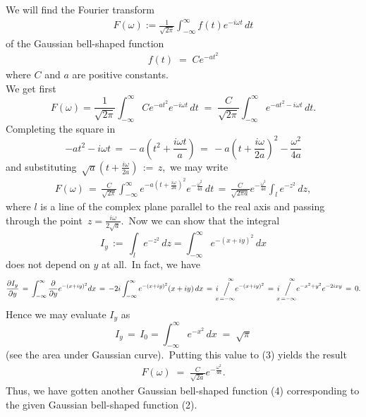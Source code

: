 \documentclass[12pt]{article}
\newcommand{\sijoitus}[2]%
{\operatornamewithlimits{\Big/}_{\!\!\!#1}^{\,#2}}
\begin{document}
  

We will find the Fourier transform 
\begin{align}
F(\omega) := \frac{1}{\sqrt{2\pi}}\int_{-\infty}^\infty f(t)e^{-i\omega t}\,dt
\end{align}
of the Gaussian bell-shaped function
\begin{align}
f(t) \;=\; Ce^{-at^2}
\end{align}
where $C$ and $a$ are positive constants.\\

We get first
$$F(\omega) = \frac{1}{\sqrt{2\pi}}\int_{-\infty}^\infty Ce^{-at^2}e^{-i\omega t}\,dt 
\;=\; \frac{C}{\sqrt{2\pi}}\int_{-\infty}^\infty e^{-at^2-i\omega t}\,dt.$$
Completing the square in
$$-at^2-i\omega t \,=\, -a\left(t^2+\frac{i\omega t}{a}\right) 
\,=\, -a\left(t+\frac{i\omega}{2a}\right)^2-\frac{\omega^2}{4a}$$
and substituting\, $\sqrt{a}\left(t+\frac{i\omega}{2a}\right) \,:=\,z$,\, we may write
\begin{align}
F(\omega) \,=\, 
\frac{C}{\sqrt{2\pi}}\int_{-\infty}^\infty e^{-a\left(t+\frac{i\omega}{2a}\right)^2}e^{-\frac{\omega^2}{4a}}\,dt
\,=\, \frac{C}{\sqrt{2\pi a}}e^{-\frac{\omega^2}{4a}}\int_l e^{-z^2}\,dz,
\end{align}
where $l$ is a line of the complex plane parallel to the real axis and passing through the point 
\,$z = \frac{i\omega}{2\sqrt{a}}$.\, Now we can show that the integral
$$I_y \,:=\, \int_l e^{-z^2}\,dz = \int_{-\infty}^\infty e^{-(x+iy)^2}\,dx$$
does not depend on $y$ at all.\, In fact, we have
$$\frac{\partial I_y}{\partial y} \,=\, \int_{-\infty}^\infty\frac{\partial}{\partial y} e^{-(x+iy)^2}dx
\,=\, -2i\int_{-\infty}^\infty e^{-(x+iy)^2}(x+iy)\,dx 
\,=\, i\!\sijoitus{x\,=-\infty}{\quad \infty}\!e^{-(x+iy)^2} \,=\, i\!\sijoitus{x\,=-\infty}{\quad \infty}\!e^{-x^2+y^2}e^{-2ixy} \,=\,0.$$
Hence we may evaluate $I_y$ as
$$I_y \,=\, I_0 = \int_{-\infty}^\infty e^{-x^2}\,dx \;=\; \sqrt{\pi}$$
(see the area under Gaussian curve).\, Putting this value to (3) yields the result
\begin{align}
F(\omega) \;=\; \frac{C}{\sqrt{2a}}e^{-\frac{\omega^2}{4a}}.
\end{align}
Thus, we have gotten another Gaussian bell-shaped function (4) corresponding to the given Gaussian bell-shaped function (2).\\
\end{document}
